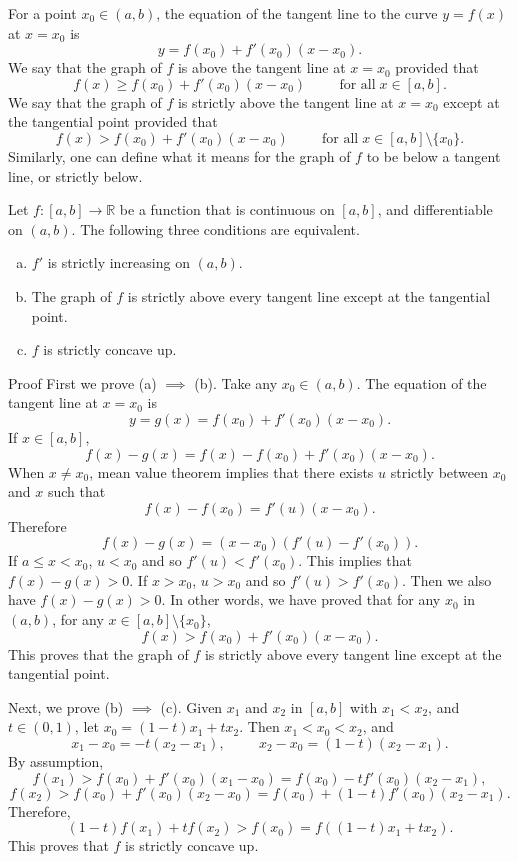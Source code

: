 \begin{example}{}
For a point $x_0\in (a, b)$, the equation of the tangent line to the curve $y=f(x)$ at $x=x_0$ is
\[y=f(x_0)+f'(x_0)(x-x_0).\] 
We say that the graph of $f$ is   above the tangent line at $x=x_0$ provided that 
\[f(x)\geq f(x_0)+f'(x_0)(x-x_0)\hspace{1cm}\text{for all}\; x\in [a,b].\]
We say that the graph of $f$ is  strictly  above the tangent line at $x=x_0$ except at the tangential point provided that 
\[f(x)> f(x_0)+f'(x_0)(x-x_0)\hspace{1cm}\text{for all}\; x\in [a,b]\setminus \{x_0\}.\] 
Similarly, one can define what it means for the graph of $f$ to be below a tangent line, or strictly below.
\begin{theorem}[label=thm230219_1]{}
 Let  $f:[a, b]\rightarrow\mathbb{R}$  be a   function that is continuous on $[a,b]$, and   differentiable on $(a, b)$. The following three conditions are equivalent.


\begin{enumerate}[(a)]

\item $f'$ is strictly increasing on $(a, b)$.
\item The graph of $f$ is strictly  above every tangent line except at the tangential point.
\item $f$ is strictly concave up.
\end{enumerate}
 
\end{theorem}


\begin{myproof}{Proof}
First we prove (a) $\implies$ (b). Take any $x_0\in (a, b)$. The equation of the tangent line at $x=x_0$ is
\[y=g(x)=f(x_0)+f'(x_0)(x-x_0).\] If $x\in [a, b]$, 
\[f(x)-g(x)=f(x)-f(x_0)+f'(x_0)(x-x_0).\]
When $x\neq x_0$,  mean value theorem implies that there exists $u$ strictly between $x_0$ and $x$ such that
\[f(x)-f(x_0)=f'(u)(x-x_0).\]
Therefore
\[f(x)-g(x)=(x-x_0)(f'(u)-f'(x_0)).\]If $a\leq x<x_0$, $u<x_0$ and so $f'(u)<f'(x_0)$. This implies that $f(x)-g(x)>0$. If $x>x_0$, $u>x_0$ and so $f'(u)>f'(x_0)$. Then we also have $f(x)-g(x)>0$.  In other words, we have proved that for any $x_0$ in $(a, b)$, for any $x\in [a,b]\setminus\{x_0\}$,
\[f(x)>f(x_0)+f'(x_0)(x-x_0).\]\bp
This proves that the graph of $f$ is strictly  above every tangent line except at the tangential point.

Next, we prove (b) $\implies$ (c). Given $x_1$ and $x_2$ in $[a,b]$ with $x_1<x_2$, and $t\in (0,1)$, let $x_0=(1-t)x_1+tx_2$. Then $x_1<x_0<x_2$, and 
\[x_1-x_0=-t(x_2-x_1),\hspace{1cm}x_2-x_0=(1-t)(x_2-x_1).\]
By assumption,
\[f(x_1)>f(x_0)+f'(x_0)(x_1-x_0)=f(x_0)-tf'(x_0)(x_2-x_1),\]
\[f(x_2)>f(x_0)+f'(x_0)(x_2-x_0)=f(x_0)+(1-t)f'(x_0)(x_2-x_1).\]
Therefore,
\[(1-t)f(x_1)+tf(x_2)>f(x_0)=f((1-t)x_1+tx_2).\]
This proves that $f$ is strictly concave up.


\end{myproof}
\end{example}

